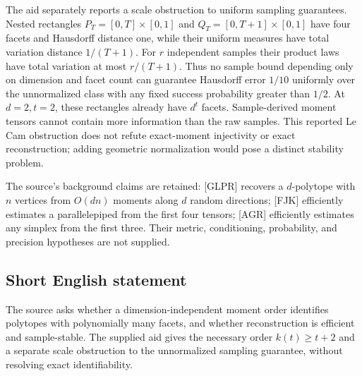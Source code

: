 \documentclass[11pt]{article}
\begin{document}
The aid separately reports a scale obstruction to uniform sampling guarantees. Nested rectangles \(P_T=[0,T]\times[0,1]\) and \(Q_T=[0,T+1]\times[0,1]\) have four facets and Hausdorff distance one, while their uniform measures have total variation distance \(1/(T+1)\). For \(r\) independent samples their product laws have total variation at most \(r/(T+1)\). Thus no sample bound depending only on dimension and facet count can guarantee Hausdorff error \(1/10\) uniformly over the unnormalized class with any fixed success probability greater than \(1/2\). At \(d=2,t=2\), these rectangles already have \(d^t\) facets. Sample-derived moment tensors cannot contain more information than the raw samples. This reported Le Cam obstruction does not refute exact-moment injectivity or exact reconstruction; adding geometric normalization would pose a distinct stability problem.

The source's background claims are retained: [GLPR] recovers a \(d\)-polytope with \(n\) vertices from \(O(dn)\) moments along \(d\) random directions; [FJK] efficiently estimates a parallelepiped from the first four tensors; [AGR] efficiently estimates any simplex from the first three. Their metric, conditioning, probability, and precision hypotheses are not supplied.
\subsection{Short English statement}
The source asks whether a dimension-independent moment order identifies polytopes with polynomially many facets, and whether reconstruction is efficient and sample-stable. The supplied aid gives the necessary order \(k(t)\ge t+2\) and a separate scale obstruction to the unnormalized sampling guarantee, without resolving exact identifiability.
\end{document}
